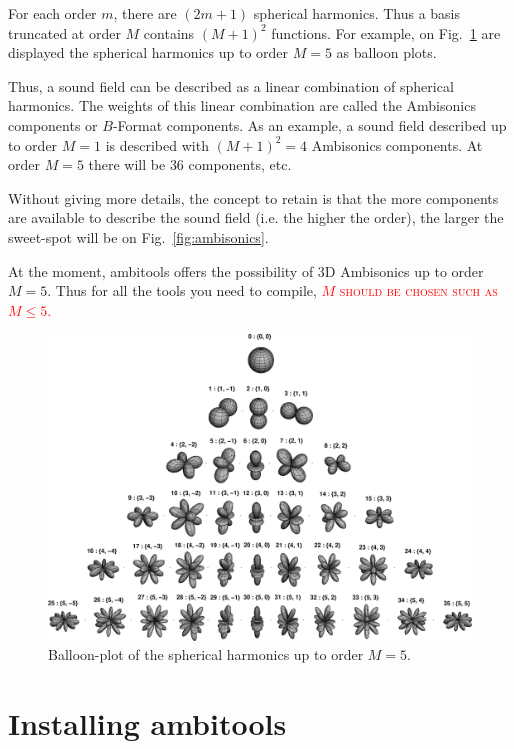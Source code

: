 \documentclass[10pt,a4paper]{article}
\begin{document}
For each order $m$, there are $(2 m +1)$ spherical harmonics. Thus a basis truncated at order $M$ contains $(M+1)^2$ functions. For example, on Fig.~\ref{fig:spherical_harmonics} are displayed the spherical harmonics up to order $M=5$ as balloon plots.

Thus, a sound field can be described as a linear combination of spherical harmonics. The weights of this linear combination are called the Ambisonics components or $B$-Format components. As an example, a sound field described up to order $M=1$ is described with $(M+1)^2=4$ Ambisonics components. At order $M=5$ there will be $36$ components, etc.

Without giving more details, the concept to retain is that the more components are available to describe the sound field (i.e. the higher the order), the larger the sweet-spot will be on Fig.~\ref{fig:ambisonics}.

At the moment, ambitools offers the possibility of 3D Ambisonics up to order $M=5$. Thus for all the tools you need to compile, \textcolor{red}{\textsc{$M$ should be chosen such as $M \leq 5$.}}

\begin{figure}[ht]
\includegraphics[width=\columnwidth]{Fig_YACN.png}
\caption{Balloon-plot of the spherical harmonics up to order $M=5$.}
\label{fig:spherical_harmonics}
\end{figure}

\pagebreak
\section{Installing ambitools}
\end{document}
